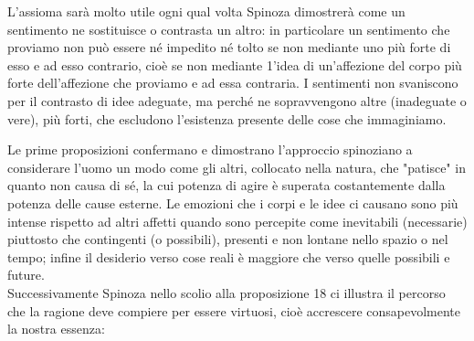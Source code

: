 L'assioma sarà molto utile ogni qual volta Spinoza dimostrerà come  un sentimento ne sostituisce o contrasta un altro: in particolare un sentimento che proviamo non può essere né impedito né tolto se
non mediante uno più forte di esso e ad esso contrario, cioè se non mediante 1’idea di un’affezione del corpo più forte dell’affezione che proviamo e ad essa contraria. I sentimenti non svaniscono per il contrasto di idee adeguate, ma perché ne sopravvengono altre (inadeguate o vere), più forti, che escludono l’esistenza presente delle cose che immaginiamo.

Le prime proposizioni confermano e dimostrano l'approccio spinoziano a considerare l'uomo un modo come gli altri, collocato nella natura, che "patisce" in quanto non causa di sé, la cui potenza di agire è superata costantemente dalla potenza delle cause esterne. Le emozioni che i corpi e le idee ci causano sono più intense rispetto ad altri affetti quando sono percepite come inevitabili (necessarie) piuttosto che contingenti (o possibili), presenti e non lontane nello spazio o nel tempo; infine il desiderio verso cose reali è maggiore che  verso quelle possibili e future.\\
Successivamente Spinoza nello scolio alla proposizione 18 ci illustra il percorso che la ragione deve compiere per essere virtuosi, cioè accrescere consapevolmente la nostra essenza:


